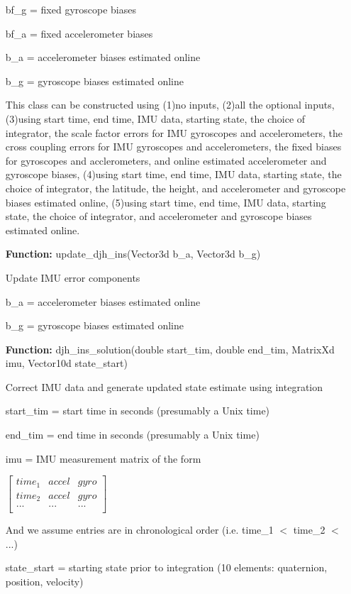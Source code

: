 \documentclass[11pt,a4paper]{article}
\begin{document}
\begin{itemize}
        bf\_g = fixed gyroscope biases
        
        bf\_a = fixed accelerometer biases

        b\_a = accelerometer biases estimated online
        
        b\_g = gyroscope biases estimated online
        
        This class can be constructed using (1)no inputs, (2)all the optional inputs, (3)using start time, end time, IMU data, starting state, the choice of integrator, the scale factor errors for IMU gyroscopes and accelerometers, the cross coupling errors for IMU gyroscopes and accelerometers, the fixed biases for gyroscopes and acclerometers, and online estimated accelerometer and gyroscope biases, (4)using start time, end time, IMU data, starting state, the choice of integrator, the latitude, the height, and accelerometer and gyroscope biases estimated online, (5)using start time, end time, IMU data, starting state, the choice of integrator, and accelerometer and gyroscope biases estimated online.
        
        \item[\textbf{Function:}] update\_djh\_ins(Vector3d b\_a, Vector3d b\_g)
        
        Update IMU error components
        
        b\_a = accelerometer biases estimated online
        
        b\_g = gyroscope biases estimated online
        
        \item[\textbf{Function:}] djh\_ins\_solution(double start\_tim, double end\_tim, MatrixXd imu, Vector10d state\_start)
        
        Correct IMU data and generate updated state estimate using integration
        
        start\_tim = start time in seconds (presumably a Unix time)
        
        end\_tim = end time in seconds (presumably a Unix time)
        
        imu = IMU measurement matrix of the form
		
		$\left[\begin{array}{ccc}
					time_1 & accel & gyro \\
					time_2 & accel & gyro \\
					...    & ...   & ...  \\	
		\end{array}\right]$
        
        And we assume entries are in chronological order (i.e. time\_1 $<$ time\_2 $<$ ...)
        
        state\_start = starting state prior to integration (10 elements: quaternion, position, velocity)
	\end{itemize}
\end{document}
